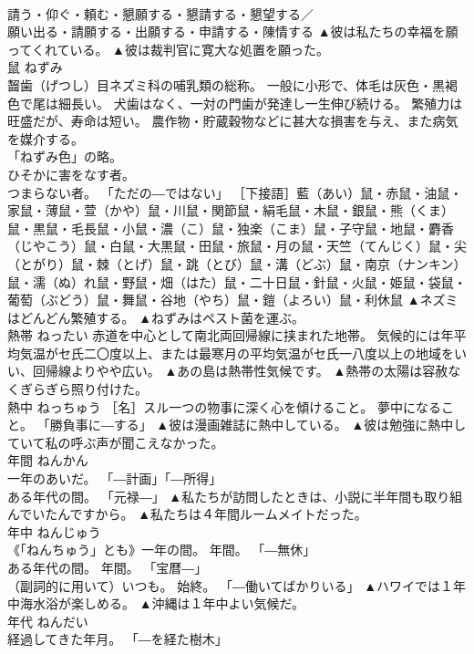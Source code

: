 \documentclass[8pt]{extreport}
\begin{document}
\begin{CJK}{UTF8}{min}
\\	請う・仰ぐ・頼む・懇願する・懇請する・懇望する／
\\	願い出る・請願する・出願する・申請する・陳情する	▲彼は私たちの幸福を願ってくれている。 ▲彼は裁判官に寛大な処置を願った。
\\	鼠	ねずみ	
\\	齧歯（げつし）目ネズミ科の哺乳類の総称。 一般に小形で、体毛は灰色・黒褐色で尾は細長い。 犬歯はなく、一対の門歯が発達し一生伸び続ける。 繁殖力は旺盛だが、寿命は短い。 農作物・貯蔵穀物などに甚大な損害を与え、また病気を媒介する。 
\\	「ねずみ色」の略。 
\\	ひそかに害をなす者。 
\\	つまらない者。 「ただの―ではない」 ［下接語］藍（あい）鼠・赤鼠・油鼠・家鼠・薄鼠・萱（かや）鼠・川鼠・関節鼠・絹毛鼠・木鼠・銀鼠・熊（くま）鼠・黒鼠・毛長鼠・小鼠・濃（こ）鼠・独楽（こま）鼠・子守鼠・地鼠・麝香（じやこう）鼠・白鼠・大黒鼠・田鼠・旅鼠・月の鼠・天竺（てんじく）鼠・尖（とがり）鼠・棘（とげ）鼠・跳（とび）鼠・溝（どぶ）鼠・南京（ナンキン）鼠・濡（ぬ）れ鼠・野鼠・畑（はた）鼠・二十日鼠・針鼠・火鼠・姫鼠・袋鼠・葡萄（ぶどう）鼠・舞鼠・谷地（やち）鼠・鎧（よろい）鼠・利休鼠	▲ネズミはどんどん繁殖する。 ▲ねずみはペスト菌を運ぶ。
\\	熱帯	ねったい	赤道を中心として南北両回帰線に挟まれた地帯。 気候的には年平均気温がセ氏二〇度以上、または最寒月の平均気温がセ氏一八度以上の地域をいい、回帰線よりやや広い。	▲あの島は熱帯性気候です。 ▲熱帯の太陽は容赦なくぎらぎら照り付けた。
\\	熱中	ねっちゅう	［名］スル一つの物事に深く心を傾けること。 夢中になること。 「勝負事に―する」	▲彼は漫画雑誌に熱中している。 ▲彼は勉強に熱中していて私の呼ぶ声が聞こえなかった。
\\	年間	ねんかん	
\\	一年のあいだ。 「―計画」「―所得」 
\\	ある年代の間。 「元禄―」	▲私たちが訪問したときは、小説に半年間も取り組んでいたんですから。 ▲私たちは４年間ルームメイトだった。
\\	年中	ねんじゅう	
\\	《「ねんちゅう」とも》一年の間。 年間。 「―無休」 
\\	ある年代の間。 年間。 「宝暦―」 
\\	（副詞的に用いて）いつも。 始終。 「―働いてばかりいる」	▲ハワイでは１年中海水浴が楽しめる。 ▲沖縄は１年中よい気候だ。
\\	年代	ねんだい	
\\	経過してきた年月。 「―を経た樹木」 

\end{CJK}
\end{document}
